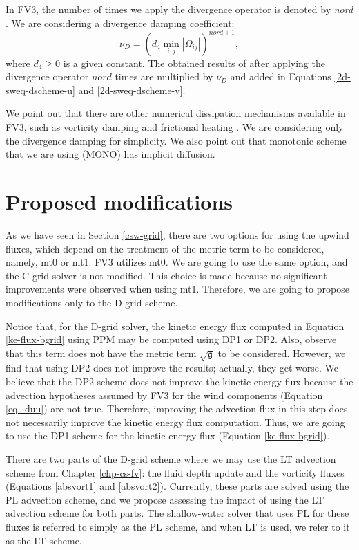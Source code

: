 In FV3, the number of times we apply the divergence operator is denoted by \textit{nord} \citep{harris:2021}.
We are considering a divergence damping coefficient:
\begin{equation}
	\nu_D = (d_4 \min_{i,j} |\Omega_{ij}|)^{nord+1},
\end{equation}
where $d_4 \ge 0$  is a given constant.
The obtained results of after applying the divergence operator $nord$ times
are multiplied by $\nu_D$ and added in Equations \eqref{2d-sweq-dscheme-u} and \eqref{2d-sweq-dscheme-v}.

We point out that there are other numerical dissipation mechanisms available in FV3, such as vorticity damping and frictional heating \citep{harris:2021}. 
We are considering only the divergence damping for simplicity.
We also point out that monotonic scheme that we are using (MONO) has implicit diffusion.

\section{Proposed modifications}
\label{sw-modf}
As we have seen in Section \ref{csw-grid}, there are two options for using the upwind fluxes, 
which depend on the treatment of the metric term to be considered, namely, mt0 or mt1.
FV3 utilizes mt0. We are going to use the same option, and the C-grid solver is not modified.
This choice is made because no significant improvements were observed when using mt1.
Therefore, we are going to propose modifications only to the D-grid scheme.

Notice that, for the D-grid solver, the kinetic energy flux computed in Equation \eqref{ke-flux-bgrid} using PPM may be computed using DP1 or DP2. 
Also, observe that this term does not have the metric term $\sqrt{\mathfrak{g}}$ to be considered.
However, we find that using DP2 does not improve the results; actually, they get worse.
We believe that the DP2 scheme does not improve the kinetic energy flux because the advection hypotheses 
assumed by FV3 for the wind components (Equation \eqref{eq_duu}) are not true.
Therefore, improving the advection flux in this step does not necessarily improve the kinetic energy flux computation.
Thus, we are going to use the DP1 scheme for the kinetic energy flux (Equation \eqref{ke-flux-bgrid}).

There are two parts of the D-grid scheme where we may use the LT advection scheme from Chapter \ref{chp-cs-fv}:
the fluid depth update and the vorticity fluxes (Equations \eqref{absvort1} and \eqref{absvort2}).
Currently, these parts are solved using the PL advection scheme, and we propose assessing the impact of using the LT advection scheme
for both parts.
The shallow-water solver that uses PL for these fluxes is referred to simply as the PL scheme, and when LT is used, we refer to it as the LT scheme.

